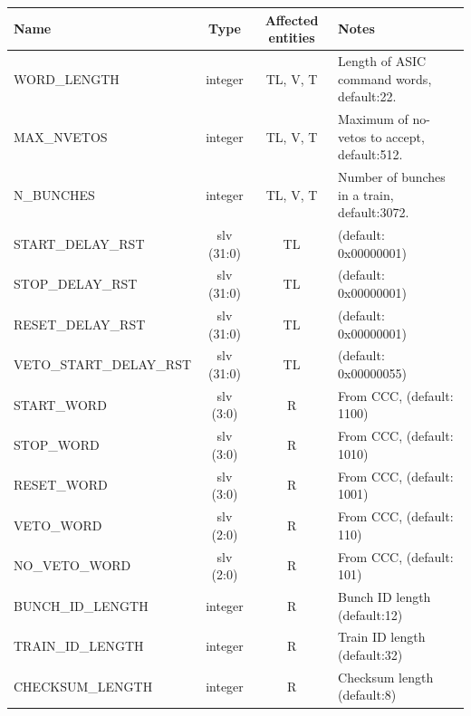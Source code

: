 \begin{table}[htbp]
  \begin{center}
    \begin{tabulary}{\textwidth}{l| c | c | L}
      Name                       & Type       & Affected entities & Notes \\
      \hline
      WORD\_LENGTH               & integer    & TL, V, T        & Length of ASIC command words, default:22.    \\
      MAX\_NVETOS                & integer    & TL, V, T        & Maximum of no-vetos to accept, default:512.  \\
      N\_BUNCHES                 & integer    & TL, V, T        & Number of bunches in a train, default:3072.  \\ 
      \hline
      START\_DELAY\_RST          & slv (31:0) & TL              & (default: 0x00000001)                \\
      STOP\_DELAY\_RST           & slv (31:0) & TL              & (default: 0x00000001)                \\
      RESET\_DELAY\_RST          & slv (31:0) & TL              & (default: 0x00000001)                \\
      VETO\_START\_DELAY\_RST    & slv (31:0) & TL              & (default: 0x00000055)                \\
      \hline                                                        
      START\_WORD                & slv (3:0)  &  R              & From CCC, (default: 1100)           \\
      STOP\_WORD                 & slv (3:0)  &  R              & From CCC, (default: 1010)           \\
      RESET\_WORD                & slv (3:0)  &  R              & From CCC, (default: 1001)           \\
      VETO\_WORD                 & slv (2:0)  &  R              & From CCC, (default: 110)            \\
      NO\_VETO\_WORD             & slv (2:0)  &  R              & From CCC, (default: 101)            \\
      BUNCH\_ID\_LENGTH          & integer    &  R              & Bunch ID length (default:12)        \\
      TRAIN\_ID\_LENGTH          & integer    &  R              & Train ID length (default:32)        \\
      CHECKSUM\_LENGTH           & integer    &  R              & Checksum length (default:8)         \\

\end{tabulary}
\end{center}
\end{table}
